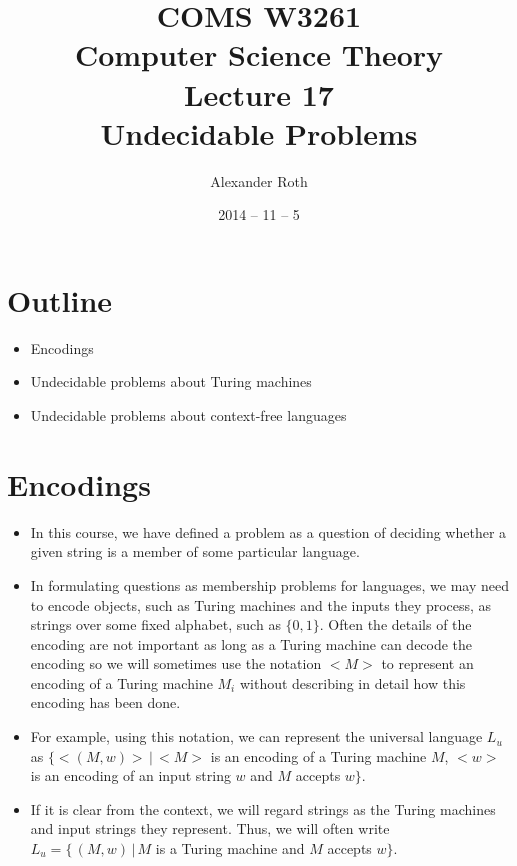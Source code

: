 \documentclass[]{article}
\begin{document}
\newcommand*{\xml}[1]{\texttt{<#1>}}
\theoremstyle{definition}
\newtheorem{thm}{Theorem}
\title{COMS W3261 \\ Computer Science Theory \\ Lecture 17 \\ Undecidable
Problems}
\author{Alexander Roth}
\date{2014 -- 11 -- 5}

\maketitle
\section*{Outline}
\begin{itemize}
\item Encodings
\item Undecidable problems about Turing machines
\item Undecidable problems about context-free languages
\end{itemize}

\section{Encodings}
\begin{itemize}
\item In this course, we have defined a problem as a question of deciding
whether a given string is a member of some particular language.
\item In formulating questions as membership problems for languages, we may need
to encode objects, such as Turing machines and the inputs they process, as
strings over some fixed alphabet, such as $\{ 0, 1 \}$. Often the details of the
encoding are not important as long as a Turing machine can decode the encoding
so we will sometimes use the notation $<M>$ to represent an encoding of a Turing
machine $M_i$ without describing in detail how this encoding has been done.
\item For example, using this notation, we can represent the universal language
$L_u$ as $\{ <(M,w)>\,|\,<M>$ is an encoding of a Turing machine $M$, $<w>$ is
an encoding of an input string $w$ and $M$ accepts $w\}$.
\item If it is clear from the context, we will regard strings as the Turing
machines and input strings they represent. Thus, we will often write $L_u =
\{\,(M,w)\,|\,M$ is a Turing machine and $M$ accepts $w\}$.
\end{itemize}
\end{document}
